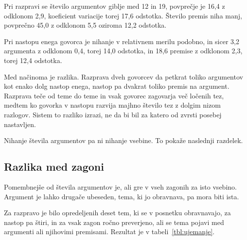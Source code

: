\documentclass[a4paper, 12pt]{book}
\begin{document}
Pri razpravi se število argumentov giblje med 12 in 19, povprečje je 16,4 z
odklonom 2,9, koeficient variacije torej 17,6 odstotka. Število premis niha
manj, povprečno 45,0 z odklonom 5,5 oziroma 12,2 odstotka.

Pri nastopu enega govorca je nihanje v relativnem merilu podobno, in sicer 3,2
argumenta z odklonom 0,4, torej 14,0 odstotka, in 18,6 premise z odklonom 2,3,
torej 12,4 odstotka.

Med načinoma je razlika. Razprava dveh govorcev da petkrat toliko argumentov kot
enako dolg nastop enega, nastop pa dvakrat toliko premis na argument. Razprava
teče od teme do teme in vsak govorec zagovarja več ločenih tez, medtem ko
govorka v nastopu razvija majhno število tez z dolgim nizom razlogov. Sistem to
razliko izrazi, ne da bi bil za katero od zvrsti posebej nastavljen.

Nihanje števila argumentov pa ni nihanje vsebine. To pokaže naslednji razdelek.

\subsection{Razlika med zagoni}
\label{sec:ujemanje}

Pomembnejše od števila argumentov je, ali gre v vseh zagonih za isto vsebino. Argument je lahko drugače ubeseden, tema, ki jo obravnava, pa mora biti
ista.

Za razpravo je bilo opredeljenih deset tem, ki se v posnetku obravnavajo, za nastop pa štiri, in za vsak zagon ročno preverjeno, ali se tema pojavi med argumenti ali njihovimi premisami.
Rezultat je v tabeli~\ref{tbl:ujemanje}.
\end{document}
